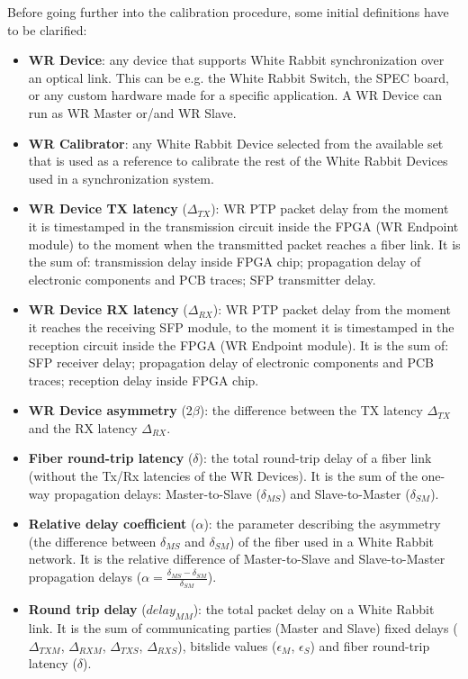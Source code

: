 Before going further into the calibration procedure, some initial definitions
have to be clarified:

\begin{itemize}

	\item {\bf WR Device}: any device that supports White Rabbit
		synchronization over an optical link. This can be e.g. the White Rabbit
		Switch, the SPEC board, or any custom hardware made for a specific
		application. A WR Device can run as WR Master or/and WR Slave.

	\item {\bf WR Calibrator}: any White Rabbit Device selected from the 
		available set that is used as a reference to calibrate the 
		rest of the White Rabbit Devices used in a synchronization system.

	\item {\bf WR Device TX latency} ($\Delta_{TX}$): WR PTP packet delay 
		from the moment it is timestamped in the transmission circuit
		inside the FPGA (WR Endpoint module) to the moment when the 
		transmitted packet reaches a fiber link. It is the sum of: 
		transmission delay inside FPGA chip; propagation delay of 
		electronic components and PCB traces; SFP transmitter delay.

	\item {\bf WR Device RX latency} ($\Delta_{RX}$): WR PTP packet delay 
		from the moment it reaches the receiving SFP module, to the 
		moment it is timestamped in the reception circuit inside the FPGA (WR
		Endpoint module). It is the sum of: SFP receiver delay; 
		propagation delay of electronic components and PCB traces; 
		reception delay inside FPGA chip.

	\item {\bf WR Device asymmetry} (2$\beta$): the difference between the TX 
		latency $\Delta_{TX}$ and the RX latency $\Delta_{RX}$.

	\item {\bf Fiber round-trip latency} ($\delta$): the total round-trip 
		delay of a fiber link (without the Tx/Rx latencies of the WR Devices). 
		It is the sum of the one-way propagation delays: Master-to-Slave 
		($\delta_{MS}$) and Slave-to-Master ($\delta_{SM}$).

	\item {\bf Relative delay coefficient} ($\alpha$): the parameter describing 
		the asymmetry (the difference between $\delta_{MS}$ and 
		$\delta_{SM}$) of the fiber used in a White Rabbit network. It 
		is the relative difference of Master-to-Slave and Slave-to-Master 
		propagation delays ($\alpha = \frac{\delta_{MS} - \delta_{SM}}
		{\delta_{SM}}$).

	\item {\bf Round trip delay} ($delay_{MM}$): the total packet delay on 
		a White Rabbit link. It is the sum of communicating parties (Master and
		Slave) fixed delays ($\Delta_{TXM}$, $\Delta_{RXM}$, $\Delta_{TXS}$,
		$\Delta_{RXS}$), bitslide values ($\epsilon_M$,
    $\epsilon_S$) and fiber round-trip latency ($\delta$).

\end{itemize}
